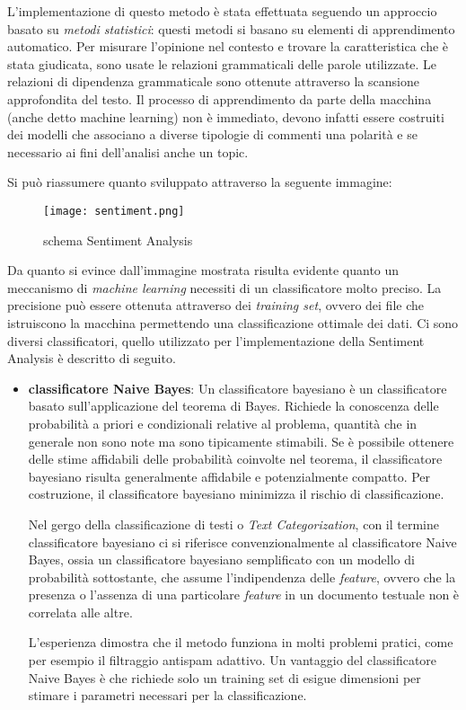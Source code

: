 L'implementazione di questo metodo è stata effettuata seguendo un approccio basato su \textit{metodi statistici}: questi metodi si basano su elementi di apprendimento automatico. Per misurare l'opinione nel contesto e trovare la caratteristica che è stata giudicata, sono usate le relazioni grammaticali delle parole utilizzate. Le relazioni di dipendenza grammaticale sono ottenute attraverso la scansione approfondita del testo. Il processo di apprendimento da parte della macchina (anche detto machine learning) non è immediato, devono infatti essere costruiti dei modelli che associano a diverse tipologie di commenti una polarità e se necessario ai fini dell'analisi anche un topic.\cite{sentiment2}

Si può riassumere quanto sviluppato attraverso la seguente immagine:
\begin{figure}[!h]
    \begin{center}
      \texttt{[image: sentiment.png]}
	\caption{schema Sentiment Analysis}
    \end{center}
  \end{figure}
 
 Da quanto si evince dall'immagine mostrata risulta evidente quanto un meccanismo di \textit{machine learning} necessiti di un classificatore molto preciso. La precisione può essere ottenuta attraverso dei \textit{training set}, ovvero dei file che istruiscono la macchina permettendo una classificazione ottimale dei dati.
Ci sono diversi classificatori, quello utilizzato per l'implementazione della Sentiment Analysis è descritto di seguito.
\begin{itemize}
\item \textbf{classificatore Naive Bayes}\cite{Kevin2015sentiment}:
Un classificatore bayesiano è un classificatore basato sull'applicazione del teorema di Bayes.
Richiede la conoscenza delle probabilità a priori e condizionali relative al problema, quantità che in generale non sono note ma sono tipicamente stimabili. Se è possibile ottenere delle stime affidabili delle probabilità coinvolte nel teorema, il classificatore bayesiano risulta generalmente affidabile e potenzialmente compatto. Per costruzione, il classificatore bayesiano minimizza il rischio di classificazione.

Nel gergo della classificazione di testi o \textit{Text Categorization}, con il termine classificatore bayesiano ci si riferisce convenzionalmente al classificatore Naive Bayes, ossia un classificatore bayesiano semplificato con un modello di probabilità sottostante, che assume l'indipendenza delle \textit{feature}, ovvero che la presenza o l'assenza di una particolare \textit{feature} in un documento testuale non è correlata alle altre.

L'esperienza dimostra che il metodo funziona in molti problemi pratici, come per esempio il filtraggio antispam adattivo. Un vantaggio del classificatore Naive Bayes è che richiede solo un training set di esigue dimensioni per stimare i parametri necessari per la classificazione.

\end{itemize}

